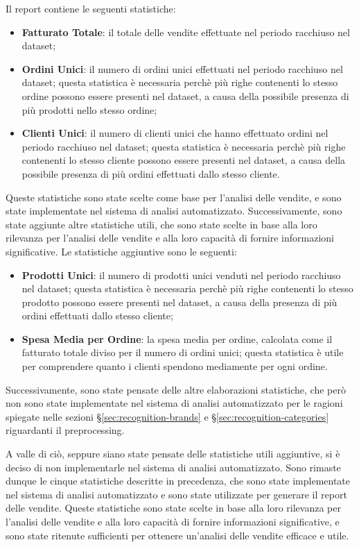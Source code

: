 Il report contiene le seguenti statistiche:
\begin{itemize}
    \item \textbf{Fatturato Totale}: il totale delle vendite effettuate nel periodo racchiuso nel dataset;
    \item \textbf{Ordini Unici}: il numero di ordini unici effettuati nel periodo racchiuso nel dataset; questa statistica è necessaria perchè più righe contenenti lo stesso ordine possono essere presenti nel dataset, a causa della possibile presenza di più prodotti nello stesso ordine;
    \item \textbf{Clienti Unici}: il numero di clienti unici che hanno effettuato ordini nel periodo racchiuso nel dataset; questa statistica è necessaria perchè più righe contenenti lo stesso cliente possono essere presenti nel dataset, a causa della possibile presenza di più ordini effettuati dallo stesso cliente.
\end{itemize}

Queste statistiche sono state scelte come base per l'analisi delle vendite, e sono state implementate nel sistema di analisi automatizzato. Successivamente, sono state aggiunte altre statistiche utili, che sono state scelte in base alla loro rilevanza per l'analisi delle vendite e alla loro capacità di fornire informazioni significative. Le statistiche aggiuntive sono le seguenti:
\begin{itemize}
    \item \textbf{Prodotti Unici}: il numero di prodotti unici venduti nel periodo racchiuso nel dataset; questa statistica è necessaria perchè più righe contenenti lo stesso prodotto possono essere presenti nel dataset, a causa della presenza di più ordini effettuati dallo stesso cliente;
    \item \textbf{Spesa Media per Ordine}: la spesa media per ordine, calcolata come il fatturato totale diviso per il numero di ordini unici; questa statistica è utile per comprendere quanto i clienti spendono mediamente per ogni ordine.
\end{itemize}

Successivamente, sono state pensate delle altre elaborazioni statistiche, che però non sono state implementate nel sistema di analisi automatizzato per le ragioni spiegate nelle sezioni \S\ref{sec:recognition-brands} e \S\ref{sec:recognition-categories} riguardanti il \gls{preprocessing}.

A valle di ciò, seppure siano state pensate delle statistiche utili aggiuntive, si è deciso di non implementarle nel sistema di analisi automatizzato. Sono rimaste dunque le cinque statistiche descritte in precedenza, che sono state implementate nel sistema di analisi automatizzato e sono state utilizzate per generare il report delle vendite. Queste statistiche sono state scelte in base alla loro rilevanza per l'analisi delle vendite e alla loro capacità di fornire informazioni significative, e sono state ritenute sufficienti per ottenere un'analisi delle vendite efficace e utile.



